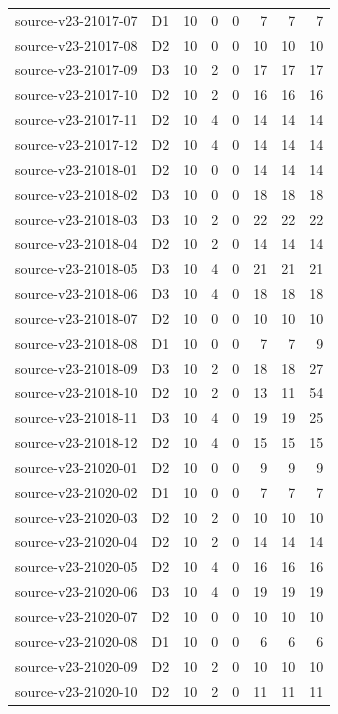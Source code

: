\begin{longtable}{p{}lrrrrrr}
source-v23-21017-07 & D1 & 10 & 0 & 0 & 7 & 7 & 7\\
source-v23-21017-08 & D2 & 10 & 0 & 0 & 10 & 10 & 10\\
source-v23-21017-09 & D3 & 10 & 2 & 0 & 17 & 17 & 17\\
source-v23-21017-10 & D2 & 10 & 2 & 0 & 16 & 16 & 16\\
source-v23-21017-11 & D2 & 10 & 4 & 0 & 14 & 14 & 14\\
source-v23-21017-12 & D2 & 10 & 4 & 0 & 14 & 14 & 14\\
source-v23-21018-01 & D2 & 10 & 0 & 0 & 14 & 14 & 14\\
source-v23-21018-02 & D3 & 10 & 0 & 0 & 18 & 18 & 18\\
source-v23-21018-03 & D3 & 10 & 2 & 0 & 22 & 22 & 22\\
source-v23-21018-04 & D2 & 10 & 2 & 0 & 14 & 14 & 14\\
source-v23-21018-05 & D3 & 10 & 4 & 0 & 21 & 21 & 21\\
source-v23-21018-06 & D3 & 10 & 4 & 0 & 18 & 18 & 18\\
source-v23-21018-07 & D2 & 10 & 0 & 0 & 10 & 10 & 10\\
source-v23-21018-08 & D1 & 10 & 0 & 0 & 7 & 7 & 9\\
source-v23-21018-09 & D3 & 10 & 2 & 0 & 18 & 18 & 27\\
source-v23-21018-10 & D2 & 10 & 2 & 0 & 13 & 11 & 54\\
source-v23-21018-11 & D3 & 10 & 4 & 0 & 19 & 19 & 25\\
source-v23-21018-12 & D2 & 10 & 4 & 0 & 15 & 15 & 15\\
source-v23-21020-01 & D2 & 10 & 0 & 0 & 9 & 9 & 9\\
source-v23-21020-02 & D1 & 10 & 0 & 0 & 7 & 7 & 7\\
source-v23-21020-03 & D2 & 10 & 2 & 0 & 10 & 10 & 10\\
source-v23-21020-04 & D2 & 10 & 2 & 0 & 14 & 14 & 14\\
source-v23-21020-05 & D2 & 10 & 4 & 0 & 16 & 16 & 16\\
source-v23-21020-06 & D3 & 10 & 4 & 0 & 19 & 19 & 19\\
source-v23-21020-07 & D2 & 10 & 0 & 0 & 10 & 10 & 10\\
source-v23-21020-08 & D1 & 10 & 0 & 0 & 6 & 6 & 6\\
source-v23-21020-09 & D2 & 10 & 2 & 0 & 10 & 10 & 10\\
source-v23-21020-10 & D2 & 10 & 2 & 0 & 11 & 11 & 11\\

\end{longtable}
